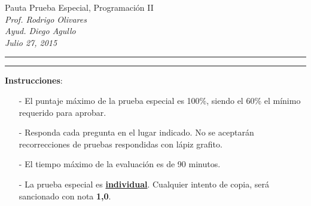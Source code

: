 \documentclass[10pt]{article}
\begin{document}
\begin{center}
    {\Large Pauta Prueba Especial, Programaci\'on II} \\
    \emph{\small Prof. Rodrigo Olivares} \\
    \emph{\small Ayud. Diego Agullo} \\
    \emph{\scriptsize Julio 27, 2015}
\end{center}
\vspace*{-35pt}
\begin{center}
    \rule{1\textwidth}{.3pt}
\end{center}
\vspace*{-42pt}
\begin{center}
    \rule{1\textwidth}{2pt}
\end{center}

\vspace*{-15pt}
\textbf{Instrucciones}:
\vspace*{-15pt}

\begin{itemize}
    \item[-] El puntaje m\'aximo de la prueba especial es 100\%, siendo el 60\% el m\'inimo requerido para aprobar.
	\item[-] Responda cada pregunta en el lugar indicado. No se aceptar\'an recorrecciones de pruebas respondidas con l\'apiz grafito.
	\item[-] El tiempo m\'aximo de la evaluaci\'on es de 90 minutos.
    \item[-] La prueba especial es \underline{\textbf{individual}}. Cualquier intento de copia, ser\'a sancionado con nota \textbf{1,0}.
\end{itemize}
\vspace*{-20pt}
\end{document}
